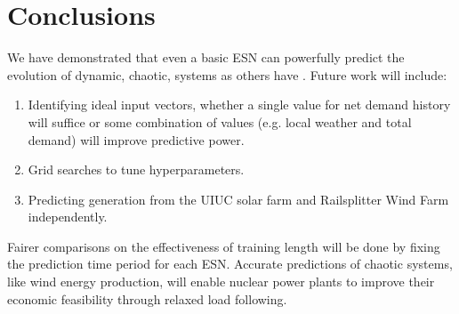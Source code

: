 \section{Conclusions}

We have demonstrated that even a basic \acrshort{ESN} can
powerfully predict the evolution of dynamic, chaotic, systems as others have
\cite{pathak_model-free_2018,wikner_combining_2020,bianchi_reservoir_2020}.
Future work will include:
\begin{enumerate}
  \item Identifying ideal input vectors, whether a single value for net demand
  history will suffice or some combination of values (e.g. local weather and
  total demand) will improve predictive power.
  \item Grid searches to tune hyperparameters.
  \item Predicting generation from the UIUC solar farm and Railsplitter Wind
  Farm independently.
\end{enumerate}
Fairer comparisons on the effectiveness of training length will be done by
fixing the prediction time period for each ESN.
Accurate predictions of chaotic systems, like wind energy production, will
enable nuclear power plants to improve their economic feasibility through
relaxed load following.

